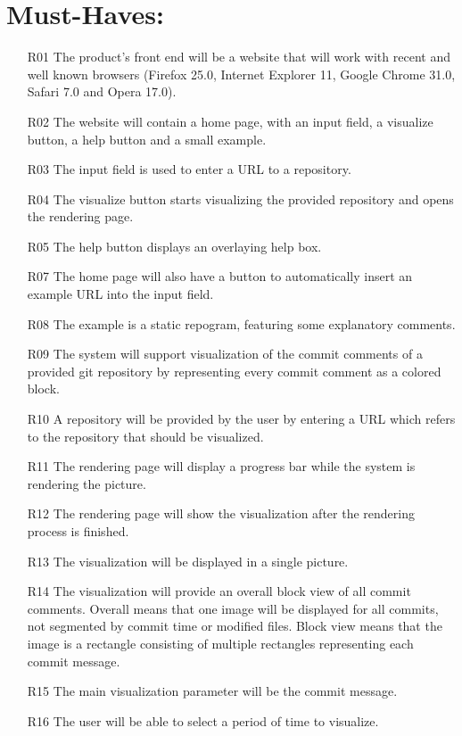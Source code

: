 \documentclass[12pt]{scrartcl}
\begin{document}
\section{Must-Haves:}
\begin{enumerate}
\item [R01] The product's front end will be a website that will work with recent and well known browsers (Firefox 25.0, Internet Explorer 11, Google Chrome 31.0, Safari 7.0 and Opera 17.0).
\item [R02] The website will contain a home page, with an input field, a visualize button, a help button and a small example.
\item [R03] The input field is used to enter a URL to a repository.
\item [R04] The visualize button starts visualizing the provided repository and opens the rendering page.
\item [R05] The help button displays an overlaying help box.
\item [R07] The home page will also have a button to automatically insert an example URL into the input field.
\item [R08] The example is a static repogram, featuring some explanatory comments.
\item [R09] The system will support visualization of the commit comments of a provided git repository by representing every commit comment as a colored block.
\item [R10] A repository will be provided by the user by entering a URL which refers to the repository that should be visualized.
\item [R11] The rendering page will display a progress bar while the system is rendering the picture.
\item [R12] The rendering page will show the visualization after the rendering process is finished.
\item [R13] The visualization will be displayed in a single picture.
\item [R14] The visualization will provide an overall block view of all commit
	comments. Overall means that one image will be displayed for all
	commits, not segmented by commit time or modified files. Block view means
	that the image is a rectangle consisting of multiple rectangles
	representing each commit message.
\item [R15] The main visualization parameter will be the commit message.
\item [R16] The user will be able to select a period of time to visualize. 

\end{enumerate}
\end{document}
